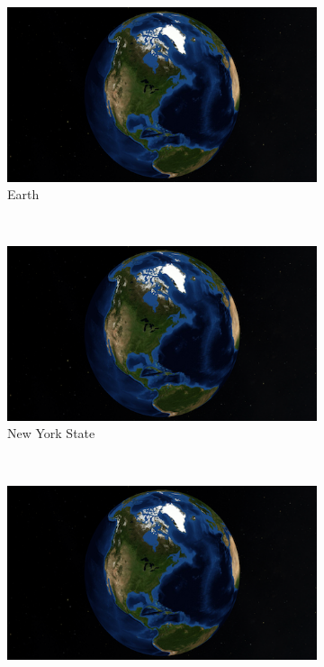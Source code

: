 \begin{figure}[htbp]
    \centering
    \begin{subfigure}[bt]{0.31\textwidth}
        \includegraphics[width=\textwidth]{figures/results/os_view_earth.png}
        \caption{Earth}
    \end{subfigure}
    ~
    \begin{subfigure}[bt]{0.31\textwidth}
        \includegraphics[width=\textwidth]{figures/results/os_view_earth.png}
        \caption{New York State}
    \end{subfigure}
    ~
    \begin{subfigure}[bt]{0.31\textwidth}
        \includegraphics[width=\textwidth]{figures/results/os_view_earth.png}

\end{subfigure}
\end{figure}
